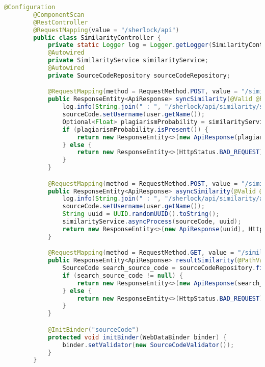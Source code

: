     \newpage
    \begin{lstlisting}[language=java]
        @Configuration
        @ComponentScan
        @RestController
        @RequestMapping(value = "/sherlock/api")
        public class SimilarityController {
            private static Logger log = Logger.getLogger(SimilarityController.class.getName());
            @Autowired
            private SimilarityService similarityService;
            @Autowired
            private SourceCodeRepository sourceCodeRepository;

            @RequestMapping(method = RequestMethod.POST, value = "/similarity/sync")
            public ResponseEntity<ApiResponse> syncSimilarity(@Valid @RequestBody SourceCode sourceCode, Principal user) {
                log.info(String.join(" : ", "/sherlock/api/similarity/sync", user.getName(), sourceCode.toString()));
                sourceCode.setUsername(user.getName());
                Optional<Float> plagiarismProbability = similarityService.syncProcess(sourceCode);
                if (plagiarismProbability.isPresent()) {
                    return new ResponseEntity<>(new ApiResponse(plagiarismProbability.get().toString()), HttpStatus.OK);
                } else {
                    return new ResponseEntity<>(HttpStatus.BAD_REQUEST);
                }
            }

            @RequestMapping(method = RequestMethod.POST, value = "/similarity/async")
            public ResponseEntity<ApiResponse> asyncSimilarity(@Valid @RequestBody SourceCode sourceCode, Principal user) {
                log.info(String.join(" : ", "/sherlock/api/similarity/async", user.getName(), sourceCode.toString()));
                sourceCode.setUsername(user.getName());
                String uuid = UUID.randomUUID().toString();
                similarityService.asyncProcess(sourceCode, uuid);
                return new ResponseEntity<>(new ApiResponse(uuid), HttpStatus.OK);
            }

            @RequestMapping(method = RequestMethod.GET, value = "/similarity/result/{uuid}")
            public ResponseEntity<ApiResponse> resultSimilarity(@PathVariable String uuid) {
                SourceCode search_source_code = sourceCodeRepository.findOne(uuid);
                if (search_source_code != null) {
                    return new ResponseEntity<>(new ApiResponse(search_source_code.getPlagiarismProbability()), HttpStatus.OK);
                } else {
                    return new ResponseEntity<>(HttpStatus.BAD_REQUEST);
                }
            }

            @InitBinder("sourceCode")
            protected void initBinder(WebDataBinder binder) {
                binder.setValidator(new SourceCodeValidator());
            }
        }

    \end{lstlisting}

